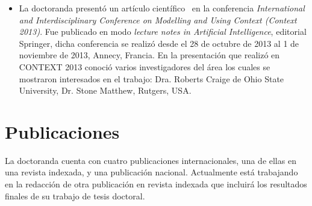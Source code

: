 \begin{itemize}
\item La doctoranda present\'o un art\'iculo cient\'ifico~\cite{benotti-altamirano-context2013} en la conferencia \emph{International and Interdisciplinary Conference on Modelling and Using Context (Context 2013)}. Fue publicado en modo \emph{lecture notes in Artificial Intelligence}, editorial Springer, dicha conferencia se realiz\'o desde el 28 de octubre de 2013 al 1 de noviembre de 2013, Annecy, Francia. En la presentaci\'on que realiz\'o en CONTEXT 2013 conoci\'o varios investigadores del \'area los cuales se mostraron interesados en el trabajo: Dra. Roberts Craige de Ohio	State	University, Dr. Stone Matthew, Rutgers, USA.
\end{itemize}


\section{Publicaciones}
 
La doctoranda cuenta con cuatro publicaciones internacionales, una de ellas en una revista indexada, y una publicaci\'on nacional. Actualmente est\'a trabajando en la redacci\'on de otra publicaci\'on en revista indexada que incluir\'a los resultados finales de su trabajo de tesis doctoral.

